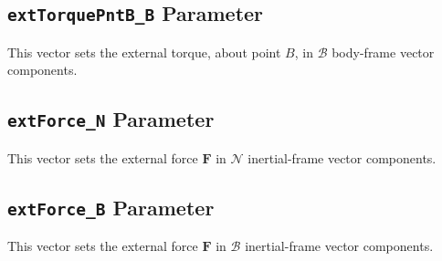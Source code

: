\documentclass[]{BasiliskReportMemo}
\begin{document}
\subsection{{\tt extTorquePntB\_B} Parameter}
This vector sets the external torque, about point $B$, in $\mathcal{B}$ body-frame vector components.

\subsection{{\tt extForce\_N} Parameter}
This vector sets the external force $\bm F$ in $\mathcal{N}$ inertial-frame vector components.

\subsection{{\tt extForce\_B} Parameter}
This vector sets the external force $\bm F$ in $\mathcal{B}$ inertial-frame vector components.
\end{document}
